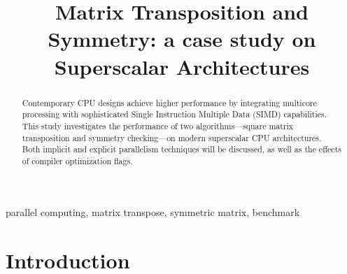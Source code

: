 \documentclass[conference]{IEEEtran}
\begin{document}
\title{Matrix Transposition and Symmetry: a case study on Superscalar Architectures\\
}

\author{
}

\maketitle


\begin{abstract}
Contemporary CPU designs achieve higher performance by integrating multicore processing with sophisticated Single Instruction Multiple Data (SIMD) capabilities.
This study investigates the performance of two algorithms—square matrix transposition and symmetry checking—on modern superscalar CPU architectures. Both implicit and explicit parallelism techniques will be discussed, as well as the effects of compiler optimization flags.
\end{abstract}

\begin{IEEEkeywords}
parallel computing, matrix transpose, symmetric matrix, benchmark
\end{IEEEkeywords}

\section{Introduction}
\end{document}
